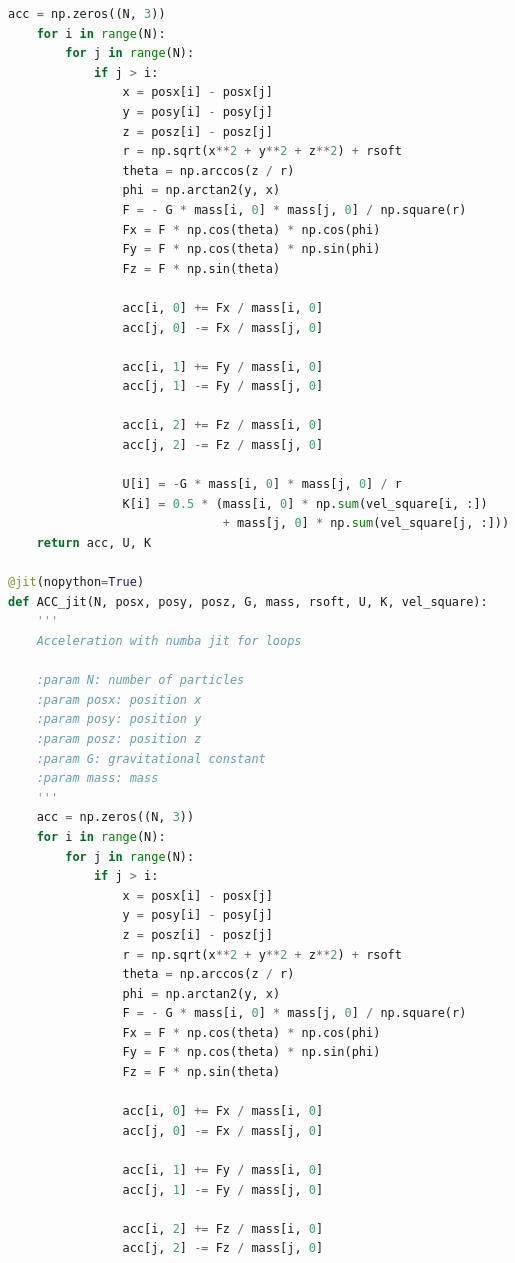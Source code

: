 \documentclass[12pt]{article}
\begin{document}
\begin{lstlisting}[language={Python}]
    acc = np.zeros((N, 3))
    for i in range(N):
        for j in range(N):
            if j > i:
                x = posx[i] - posx[j]
                y = posy[i] - posy[j]
                z = posz[i] - posz[j]
                r = np.sqrt(x**2 + y**2 + z**2) + rsoft
                theta = np.arccos(z / r)
                phi = np.arctan2(y, x)
                F = - G * mass[i, 0] * mass[j, 0] / np.square(r)
                Fx = F * np.cos(theta) * np.cos(phi)
                Fy = F * np.cos(theta) * np.sin(phi)
                Fz = F * np.sin(theta)

                acc[i, 0] += Fx / mass[i, 0]
                acc[j, 0] -= Fx / mass[j, 0]

                acc[i, 1] += Fy / mass[i, 0]
                acc[j, 1] -= Fy / mass[j, 0]
                
                acc[i, 2] += Fz / mass[i, 0]
                acc[j, 2] -= Fz / mass[j, 0]
                
                U[i] = -G * mass[i, 0] * mass[j, 0] / r
                K[i] = 0.5 * (mass[i, 0] * np.sum(vel_square[i, :]) 
                              + mass[j, 0] * np.sum(vel_square[j, :]))
    return acc, U, K

@jit(nopython=True)
def ACC_jit(N, posx, posy, posz, G, mass, rsoft, U, K, vel_square):
    '''
    Acceleration with numba jit for loops
    
    :param N: number of particles
    :param posx: position x
    :param posy: position y
    :param posz: position z
    :param G: gravitational constant
    :param mass: mass
    '''
    acc = np.zeros((N, 3))
    for i in range(N):
        for j in range(N):
            if j > i:
                x = posx[i] - posx[j]
                y = posy[i] - posy[j]
                z = posz[i] - posz[j]
                r = np.sqrt(x**2 + y**2 + z**2) + rsoft
                theta = np.arccos(z / r)
                phi = np.arctan2(y, x)
                F = - G * mass[i, 0] * mass[j, 0] / np.square(r)
                Fx = F * np.cos(theta) * np.cos(phi)
                Fy = F * np.cos(theta) * np.sin(phi)
                Fz = F * np.sin(theta)

                acc[i, 0] += Fx / mass[i, 0]
                acc[j, 0] -= Fx / mass[j, 0]

                acc[i, 1] += Fy / mass[i, 0]
                acc[j, 1] -= Fy / mass[j, 0]
                
                acc[i, 2] += Fz / mass[i, 0]
                acc[j, 2] -= Fz / mass[j, 0]
                

\end{lstlisting}
\end{document}
